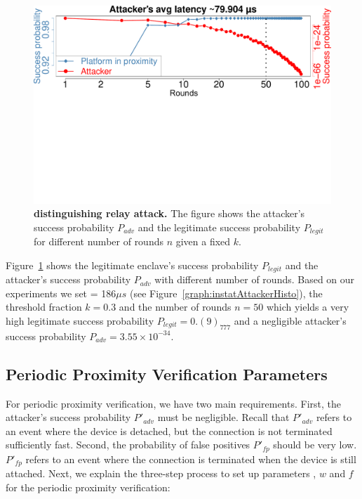 \begin{figure}[h]
  \centering
    \includegraphics[trim={0 12.8cm 0 0}, clip, width=0.9\linewidth]{chapters/ProximiTEE/figures/InstantAttackerSuccess.pdf}
    \caption[\name distinguishing relay attack]{\textbf{\name distinguishing relay attack.} The figure shows the attacker's success probability $P_{adv}$ and the legitimate success probability $P_{legit}$ for different number of rounds $n$ given a fixed $k$.}

    \label{graph:instantAttackerSuccess}
\end{figure}


 Figure~\ref{graph:instantAttackerSuccess} shows the legitimate enclave's success probability $P_{legit}$ and the attacker's success probability $P_{adv}$ with different number of rounds. Based on our experiments we set \connect= 186$\mu s$ (see Figure~\ref{graph:instatAttackerHisto}), the threshold fraction $k=0.3$ and the number of rounds $n=50$ which yields a very high legitimate success probability $P_{legit}=0.(9)_777$ and a negligible attacker's success probability $P_{adv}=3.55\times 10^{-34}$.





\subsection{Periodic Proximity Verification Parameters}
\label{sec:evaluationL:continuousParameters}


For periodic proximity verification, we have two main requirements. First, the attacker's success probability $P'_{adv}$ must be negligible. Recall that $P'_{adv}$ refers to an event where the device is detached, but the connection is not terminated sufficiently fast. Second, the probability of false positives $P'_{fp}$ should be very low. $P'_{fp}$ refers to an event where the connection is terminated when the device is still attached. Next, we explain the three-step process to set up parameters \detach, $w$ and $f$ for the periodic proximity verification:


